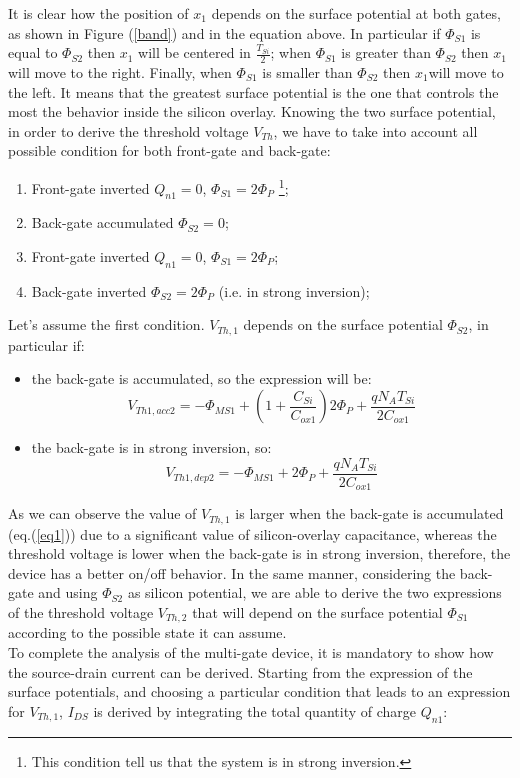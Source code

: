 \documentclass[a4paper, 12pt, twoside, openright]{report}
\begin{document}
It is clear how the position of \emph{$x_{1}$} depends on the surface potential at both gates, as shown in Figure (\ref{band}) and in the equation above. In particular if $\Phi_{S1}$ is equal to $\Phi_{S2}$ then \emph{$x_{1}$} will be centered in $\frac{T_{Si}}{2}$; when $\Phi_{S1}$ is greater than $\Phi_{S2}$ then \emph{$x_{1}$} will move to the right. Finally, when $\Phi_{S1}$ is smaller than $\Phi_{S2}$ then \emph{$x_{1}$}will move to the left. It means that the greatest surface potential is the one that controls the most the behavior inside the silicon overlay.
Knowing the two surface potential, in order to derive the threshold voltage $V_{Th}$, we have to take into account all possible condition for both front-gate and back-gate:

\begin{enumerate}
\item Front-gate inverted $Q_{n1} = 0$, $\Phi_{S1} = 2\Phi_P$ \footnote{This condition tell us that the system is in strong inversion.};
\item Back-gate accumulated $\Phi_{S2} = 0$;
\item Front-gate inverted $Q_{n1} = 0$, $\Phi_{S1} = 2\Phi_P$;
\item Back-gate inverted $\Phi_{S2} = 2\Phi_P$ (i.e. in strong inversion);
\end{enumerate}

Let's assume the first condition. $V_{Th,1}$ depends on the surface potential $\Phi_{S2}$, in particular if:
\begin{itemize}
\item the back-gate is accumulated, so the expression will be:
	\begin{equation}
	V_{Th1,acc2} = -\Phi_{MS1} + (1 + \frac{C_{Si}}{C_{ox1}})2\Phi_P + \frac{q N_A T_{Si}}{2 C_{ox1}}
	\label{eq1}
	\end{equation}
\item the back-gate is in strong inversion, so:
	\begin{equation}
	V_{Th1,dep2} = -\Phi_{MS1} + 2\Phi_P + \frac{q N_A T_{Si}}{2 C_{ox1}}
	\end{equation}
\end{itemize}

As we can observe the value of $V_{Th,1}$ is larger when the back-gate is accumulated (eq.(\ref{eq1})) due to a significant value of silicon-overlay capacitance, whereas the threshold voltage is lower when the back-gate is in strong inversion, therefore, the device has a better on/off behavior.
In the same manner, considering the back-gate and using $\Phi_{S2}$ as silicon potential, we are able to derive the two expressions of the threshold voltage $V_{Th,2}$ that will depend on the surface potential $\Phi_{S1}$ according to the possible state it can assume.\\
To complete the analysis of the multi-gate device, it is mandatory to show how the source-drain current can be derived. Starting from the expression of the surface potentials, and choosing a particular condition that leads to an expression for $V_{Th,1}$, $I_{DS}$ is derived by integrating the total quantity of charge $Q_{n1}$:
\end{document}
